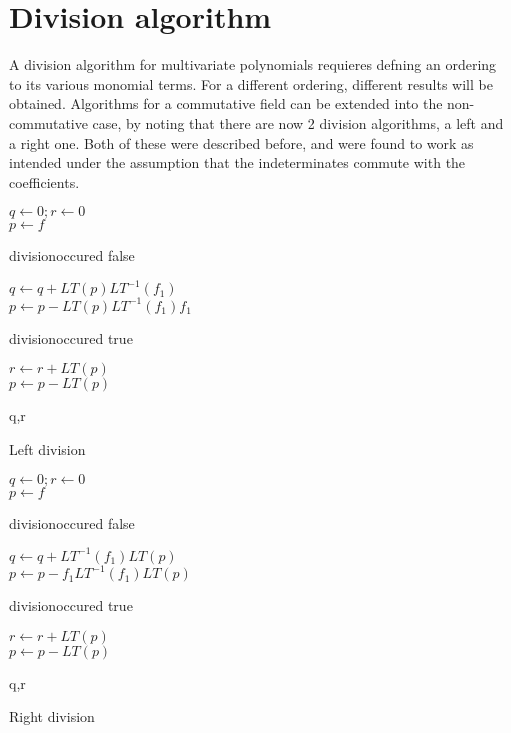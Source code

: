 \section{Division algorithm}
A division algorithm for multivariate polynomials requieres defning an ordering to its various monomial terms\cite{cox}. For a different ordering, different results will be obtained. Algorithms for a commutative field can be extended into the non-commutative case, by noting that there are now 2 division algorithms, a left and a right one. Both of these were described before, and were found to work as intended under the assumption that the indeterminates commute with the coefficients.
\\
\noindent\begin{minipage}{.5\linewidth}


\begin{algorithm}[H]
\SetAlgoLined
\SetNoFillComment
\vspace{3mm}
$q \leftarrow 0; r \leftarrow 0$\\
$p \leftarrow f$\;
{
    divisionoccured \leftarrow false\\
    {
    $q \leftarrow q + LT(p) LT^{-1}(f_1)$\\
    $p \leftarrow p - LT(p) LT^{-1}(f_1)f_1$

    divisionoccured \leftarrow true\\
    }
    {
        $r \leftarrow r + LT(p)$\\
         $p \leftarrow p - LT(p)$
   }
}
\Return q,r\;
\caption{Left division}
\end{algorithm}

\end{minipage}
\begin{minipage}{.5\linewidth}


\begin{algorithm}[H]
\SetAlgoLined
\SetNoFillComment
\vspace{3mm}
$q \leftarrow 0; r \leftarrow 0$\\
$p \leftarrow f$\;
{
    divisionoccured \leftarrow false\\
    {
    $q \leftarrow q + LT^{-1}(f_1)  LT(p) $\\
    $p \leftarrow p -  f_1LT^{-1}(f_1) LT(p)$

    divisionoccured \leftarrow true\\
    }
    {
        $r \leftarrow r + LT(p)$\\
         $p \leftarrow p - LT(p)$
   }
}
\Return q,r\;
\caption{Right division}
\end{algorithm}


\end{minipage}

